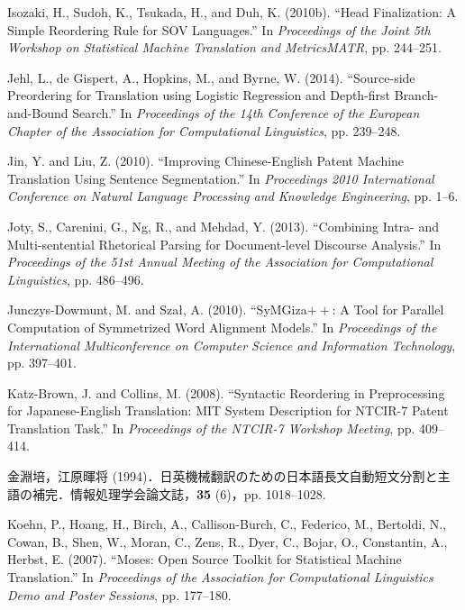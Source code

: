 \documentclass[japanese]{jnlp_1.4}
\begin{document}
\begin{thebibliography}{}
\item
Isozaki, H., Sudoh, K., Tsukada, H., and Duh, K. (2010b). ``Head 
Finalization: A Simple Reordering Rule for SOV Languages.'' In \textit{Proceedings of the Joint 5th Workshop on Statistical Machine Translation and MetricsMATR}, pp. 
244--251.

\item
Jehl, L., de Gispert, A., Hopkins, M., and Byrne, W. (2014). ``Source-side 
Preordering for Translation using Logistic Regression and Depth-first 
Branch-and-Bound Search.'' In \textit{Proceedings of the 14th Conference of the European Chapter of the Association for Computational Linguistics}, pp. 239--248.

\item
Jin, Y. and Liu, Z. (2010). ``Improving Chinese-English Patent Machine 
Translation Using Sentence Segmentation.'' In \textit{Proceedings 2010 International Conference on Natural Language Processing and Knowledge Engineering}, pp. 1--6.

\item
Joty, S., Carenini, G., Ng, R., and Mehdad, Y. (2013). ``Combining Intra- 
and Multi-sentential Rhetorical Parsing for Document-level Discourse 
Analysis.'' In \textit{Proceedings of the 51st Annual Meeting of the Association for Computational Linguistics}, pp. 486--496.

\item
Junczys-Dowmunt, M. and Sza\l , A. (2010). ``SyMGiza$++$: A Tool for 
Parallel Computation of Symmetrized Word Alignment Models.'' In \textit{Proceedings of the International Multiconference on Computer Science and Information Technology}, pp. 
397--401.

\item
Katz-Brown, J. and Collins, M. (2008). ``Syntactic Reordering in 
Preprocessing for Japanese-English Translation: MIT System Description for 
NTCIR-7 Patent Translation Task.'' In \textit{Proceedings of the NTCIR-7 Workshop Meeting}, pp. 409--414.

\item
金淵培，江原暉将 (1994)．日英機械翻訳のための日本語長文自動短文分割と主語の補完．情報処理学会論文誌，\textbf{35} 
(6)，pp. 1018--1028.

\item
Koehn, P., Hoang, H., Birch, A., Callison-Burch, C., Federico, M., Bertoldi, 
N., Cowan, B., Shen, W., Moran, C., Zens, R., Dyer, C., Bojar, O., 
Constantin, A., Herbst, E. (2007). ``Moses: Open Source Toolkit for 
Statistical Machine Translation.'' In \textit{Proceedings of the Association for Computational Linguistics Demo and Poster Sessions}, pp. 177--180.


\end{thebibliography}
\end{document}
